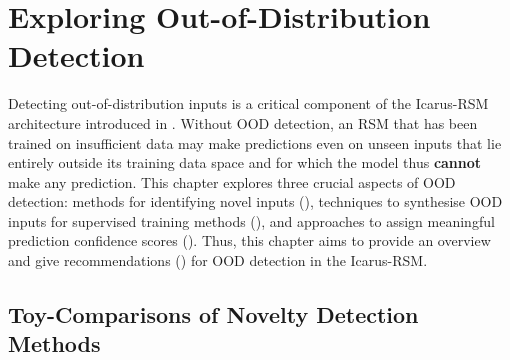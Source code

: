 \chapter{Exploring Out-of-Distribution Detection} \label{txt:ood-detection-chapter}

Detecting out-of-distribution inputs is a critical component of the Icarus-RSM architecture introduced in . Without OOD detection, an RSM that has been trained on insufficient data may make predictions even on unseen inputs that lie entirely outside its training data space and for which the model thus \textbf{cannot} make any prediction. This chapter explores three crucial aspects of OOD detection: methods for identifying novel inputs (), techniques to synthesise OOD inputs for supervised training methods (), and approaches to assign meaningful prediction confidence scores (). Thus, this chapter aims to provide an overview and give recommendations () for OOD detection in the Icarus-RSM.

\section{Toy-Comparisons of Novelty Detection Methods} \label{txt:ood-detection-comparison}

